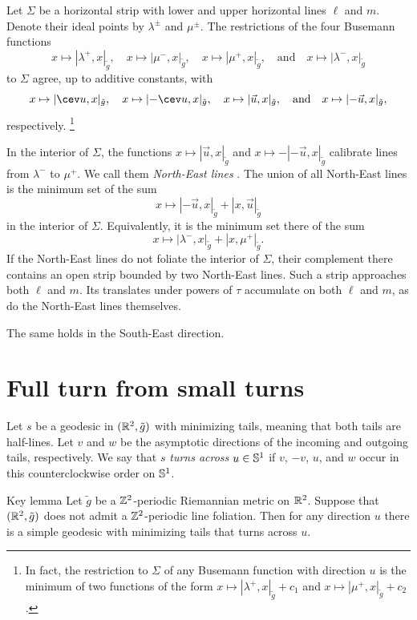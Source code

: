 \documentclass[a4paper,10pt]{article}
\begin{document}
Let $\Sigma$ be a horizontal strip with lower and upper horizontal lines $\ell$ and $m$.
Denote their ideal points by $\lambda^\pm$ and $\mu^\pm$.
The restrictions of the four Busemann functions
\[x\mapsto |\lambda^+,x|_{\tilde g},
\quad x\mapsto |\mu^-,x|_{\tilde g},
\quad x\mapsto |\mu^+,x|_{\tilde g},
\quad\text{and}\quad
x\mapsto |\lambda^-,x|_{\tilde g}\]
to $\Sigma$ agree, up to additive constants, with
\[x\mapsto |\cev u,x|_{\tilde g},
\quad x\mapsto |{-}\cev u,x|_{\tilde g},
\quad x\mapsto |\vec u,x|_{\tilde g},
\quad\text{and}\quad
x\mapsto |{-}\vec u,x|_{\tilde g},\]
respectively.%
\footnote{In fact, the restriction to $\Sigma$ of any Busemann function with direction $u$ is the minimum of two functions of the form
$x\mapsto |\lambda^+,x|_{\tilde g}+c_1$ and $x\mapsto |\mu^+,x|_{\tilde g}+c_2$.}

In the interior of $\Sigma$, the functions $x\mapsto |\vec u,x|_{\tilde g}$ and $x\mapsto -|{-}\vec u,x|_{\tilde g}$ calibrate lines from $\lambda^-$ to $\mu^+$.
We call them \emph{North-East lines} \cite[6.7 and 6.8]{bangert1988}.
The union of all North-East lines is the minimum set of the sum
\[x\mapsto |{-}\vec u,x|_{\tilde g}+|x,\vec u|_{\tilde g}\]
in the interior of $\Sigma$.
Equivalently, it is the minimum set there of the sum
\[x\mapsto |\lambda^-,x|_{\tilde g}+|x,\mu^+|_{\tilde g}.\]
If the North-East lines do not foliate the interior of $\Sigma$, their complement there contains an open strip bounded by two North-East lines.
Such a strip approaches both $\ell$ and $m$.
Its translates under powers of $\tau$ accumulate on both $\ell$ and $m$, as do the North-East lines themselves.

The same holds in the South-East direction.

\section{Full turn from small turns}

Let $s$ be a geodesic in $(\mathbb{R}^2,\tilde g)$ with minimizing tails, meaning that both tails are half-lines.
Let $v$ and $w$ be the asymptotic directions of the incoming and outgoing tails, respectively.
We say that $s$ \emph{turns across} $u\in\mathbb{S}^1$ if $v$, $-v$, $u$, and $w$ occur in this counterclockwise order on $\mathbb{S}^1$.


\begin{thm}{Key lemma}\label{lem:key}
Let $\tilde g$ be a $\mathbb{Z}^2$-periodic Riemannian metric on $\mathbb{R}^2$.
Suppose that $(\mathbb{R}^2,\tilde g)$ does not admit a $\mathbb{Z}^2$-periodic line foliation.
Then for any direction $u$ there is a simple geodesic with minimizing tails that turns across $u$.

\end{thm}
\end{document}
